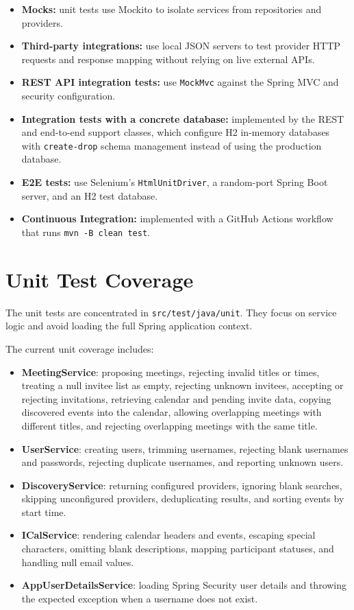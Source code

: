 \begin{itemize}
    \item \textbf{Mocks:} unit tests use Mockito to isolate services from repositories and providers.
    \item \textbf{Third-party integrations:} use local JSON servers to test provider HTTP requests and response mapping without relying on live external APIs.
    \item \textbf{REST API integration tests:} use \texttt{MockMvc} against the Spring MVC and security configuration.
    \item \textbf{Integration tests with a concrete database:} implemented by the REST and end-to-end support classes, which configure H2 in-memory databases with \texttt{create-drop} schema management instead of using the production database.
    \item \textbf{E2E tests:} use Selenium's \texttt{HtmlUnitDriver}, a random-port Spring Boot server, and an H2 test database.
    \item \textbf{Continuous Integration:} implemented with a GitHub Actions workflow that runs \texttt{mvn -B clean test}.
\end{itemize}

\section{Unit Test Coverage}

The unit tests are concentrated in \texttt{src/test/java/unit}. They focus on service logic and avoid loading the full Spring application context.

The current unit coverage includes:
\begin{itemize}
    \item \textbf{MeetingService}: proposing meetings, rejecting invalid titles or times, treating a null invitee list as empty, rejecting unknown invitees, accepting or rejecting invitations, retrieving calendar and pending invite data, copying discovered events into the calendar, allowing overlapping meetings with different titles, and rejecting overlapping meetings with the same title.
    \item \textbf{UserService}: creating users, trimming usernames, rejecting blank usernames and passwords, rejecting duplicate usernames, and reporting unknown users.
    \item \textbf{DiscoveryService}: returning configured providers, ignoring blank searches, skipping unconfigured providers, deduplicating results, and sorting events by start time.
    \item \textbf{ICalService}: rendering calendar headers and events, escaping special characters, omitting blank descriptions, mapping participant statuses, and handling null email values.
    \item \textbf{AppUserDetailsService}: loading Spring Security user details and throwing the expected exception when a username does not exist.
\end{itemize}

